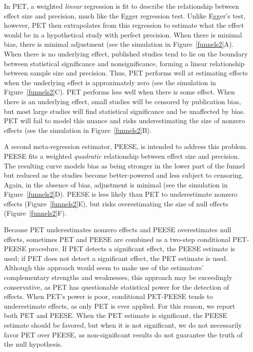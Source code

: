 \documentclass[man]{apa6}
\begin{document}
In PET, a weighted {\em linear} regression is fit to describe the relationship between effect size and precision, much like the Egger regression test. Unlike Egger's test, however, PET then extrapolates from this regression to estimate what the effect would be in a hypothetical study with perfect precision. When there is minimal bias, there is minimal adjustment (see the simulation in Figure~\ref{funnels2}A). When there is no underlying effect, published studies tend to lie on the boundary between statistical significance and nonsignificance, forming a linear relationship between sample size and precision. Thus, PET performs well at estimating effects when the underlying effect is approximately zero (see the simulation in Figure~\ref{funnels2}C). PET performs less well when there is some effect. When there is an underlying effect, small studies will be censored by publication bias, but most large studies will find statistical significance and be unaffected by bias. PET will fail to model this nuance and risks underestimating the size of nonzero effects (see the simulation in Figure~\ref{funnels2}B).

A second meta-regression estimator, PEESE, is intended to address this problem. PEESE fits a weighted {\em quadratic} relationship between effect size and precision. The resulting curve models bias as being stronger in the lower part of the funnel but reduced as the studies become better-powered and less subject to censoring. Again, in the absence of bias, adjustment is minimal (see the simulation in Figure~\ref{funnels2}D). PEESE is less likely than PET to underestimate nonzero effects (Figure~\ref{funnels2}E), but risks overestimating the size of null effects (Figure~\ref{funnels2}F).

Because PET underestimates nonzero effects and PEESE overestimates null effects, sometimes PET and PEESE are combined as a two-step conditional PET-PEESE procedure. If PET detects a significant effect, the PEESE estimate is used; if PET does not detect a significant effect, the PET estimate is used. Although this approach would seem to make use of the estimators' complementary strengths and weaknesses, this approach may be exceedingly conservative, as PET has questionable statistical power for the detection of effects. When PET's power is poor, conditional PET-PEESE tends to underestimate effects, as only PET is ever applied. For this reason, we report both PET and PEESE. When the PET estimate is significant, the PEESE estimate should be favored, but when it is not significant, we do not necessarily favor PET over PEESE, as non-significant results do not guarantee the truth of the null hypothesis.
\end{document}
